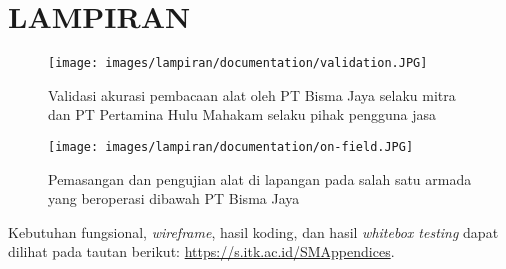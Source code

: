 \chapter*{LAMPIRAN}


\begin{figure}[!h]
    \texttt{[image: images/lampiran/documentation/validation.JPG]}
    \caption{Validasi akurasi pembacaan alat oleh PT Bisma Jaya selaku mitra dan PT Pertamina Hulu Mahakam selaku pihak pengguna jasa}
    \label{fig:doc-validation}
\end{figure}

\begin{figure}[!h]
    \texttt{[image: images/lampiran/documentation/on-field.JPG]}
    \caption{Pemasangan dan pengujian alat di lapangan pada salah satu armada yang beroperasi dibawah PT Bisma Jaya}
    \label{fig:doc-lapangan}
\end{figure}

 \label{apdx:hasil}

Kebutuhan fungsional, \textit{wireframe}, hasil koding, dan hasil \textit{whitebox testing} dapat dilihat pada tautan berikut: \url{https://s.itk.ac.id/SMAppendices}.

